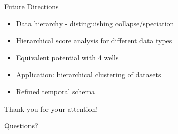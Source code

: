 \documentclass[aspectratio=169]{beamer}
\begin{document}
\begin{frame}{Future Directions}
    \begin{itemize}
        \item Data hierarchy - distinguishing collapse/speciation
        \item Hierarchical score analysis for different data types
        \item Equivalent potential with 4 wells
        \item Application: hierarchical clustering of datasets
        \item Refined temporal schema
    \end{itemize}
    
    \begin{center}
    \end{center}
\end{frame}

\begin{frame}
    \centering
    \LARGE Thank you for your attention!
    
    \vspace{1cm}
    
    \large Questions?
\end{frame}
\end{document}
